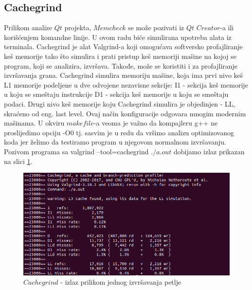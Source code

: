 \documentclass[a4paper]{article}
\begin{document}
	\subsection{Cachegrind}
	Prilikom analize $Qt$ projekta, $Memcheck$ se može pozivati iz $Qt$ $Creator$-a ili korišćenjem komandne linije. U ovom radu biće simulirana upotreba alata iz terminala. 
Cachegrind je alat Valgrind-a koji omogućava softversko profajliranje keš memorije tako što simulira i prati pristup keš memoriji mašine na kojoj se program, koji se analizira, izvršava. Takođe, može se koristiti i za profajliranje izvršavanja grana.  \cite{verifikacija1}
Cachegrind simulira memoriju mašine, koja ima prvi nivo keš L1 memorije podeljene u dve odvojene nezavisne sekcije: I1 - sekcija keš memorije u koju se smeštaju instrukcije D1 - sekcija keš memorije u koju se smeštaju podaci. Drugi nivo keš memorije koju Cachegrind simulira je objedinjen - LL, skraćeno od eng. last level. Ovaj način konfiguracije odgovara mnogim modernim mašinama. \cite{verifikacija2}
U okviru $makefile$-a veoma je važno da  kompajleru g++ ne proslijedimo opciju  -O0 tj. sasvim je u redu da vršimo analizu optimizovanog koda jer želimo da testiramo program u njegovom normalnom izvršavanju. Pozivom programa sa valgrind --tool=cachegrind $./a.out$ dobijamo izlaz prikazan na slici \ref{fig:cache1}.
	\begin{figure}[h!]
		\caption{$Cachegrind$ - izlaz prilikom jednog izvršavanja petlje}
		\label{fig:cache1}
		\includegraphics[scale=0.5]{cache1.png}
	\end{figure}
\end{document}
